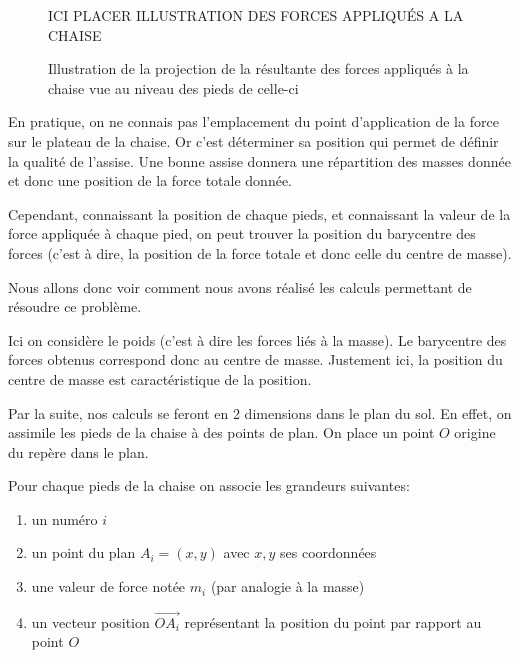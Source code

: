 \documentclass{polytech/polytech}
\begin{document}



\begin{figure}[htbp]
ICI PLACER ILLUSTRATION DES FORCES APPLIQU\'ES A LA CHAISE
\caption{Illustration de la projection de la résultante des forces appliqués à la chaise vue au niveau des pieds de celle-ci}
\label{fig:illustr_chaise_forces}
\end{figure}

En pratique, on ne connais pas l'emplacement du point d'application de la force sur le plateau de la chaise. Or c'est déterminer sa position qui permet de définir la qualité de l'assise. Une bonne assise donnera une répartition des masses donnée et donc une position de la force totale donnée.


Cependant, connaissant la position de chaque pieds, et connaissant la valeur de la force appliquée à chaque pied, on peut trouver la position du barycentre des forces (c'est à dire, la position de la force totale et donc celle du centre de masse). 

Nous allons donc voir comment nous avons réalisé les calculs permettant de résoudre ce problème.

Ici on considère le poids (c'est à dire les forces liés à la masse). Le barycentre des forces obtenus correspond donc au centre de masse. 
Justement ici, la position du centre de masse est caractéristique de la position.

Par la suite, nos calculs se feront en 2 dimensions dans le plan du sol. En effet, on assimile les pieds de la chaise à des points de plan. On place un point $O$ origine du repère dans le plan. 

Pour chaque pieds de la chaise on associe les grandeurs suivantes:

\begin{enumerate}
\item un numéro $i$
\item un point du plan $A_i=(x,y)$ avec $x,y$ ses coordonnées
\item une valeur de force notée $m_i$ (par analogie à la masse)
\item un vecteur position $\vec{OA_i}$ représentant la position du point par rapport au point $O$
\end{enumerate}
\end{document}
